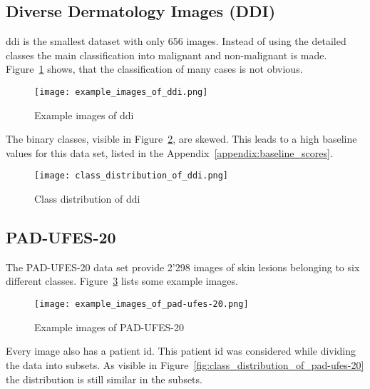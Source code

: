 \subsection{Diverse Dermatology Images (DDI)}
\gls{ddi} is the smallest dataset with only 656 images. Instead of using the detailed classes the main classification into malignant and non-malignant is made.
Figure~\ref{fig:example_images_of_ddi} shows, that the classification of many cases is not obvious.
\begin{figure}[H]
    \begin{center}
    \texttt{[image: example\_images\_of\_ddi.png]}
    \caption{Example images of \gls{ddi}}\label{fig:example_images_of_ddi}
    \end{center}
\end{figure}

The binary classes, visible in Figure~\ref{fig:class_distribution_of_ddi}, are skewed. This leads to a high baseline values for this data set, listed in the Appendix~\ref{appendix:baseline_scores}.

\begin{figure}[H]
    \begin{center}
    \texttt{[image: class\_distribution\_of\_ddi.png]}
    \caption{Class distribution of \gls{ddi}}\label{fig:class_distribution_of_ddi}
    \end{center}
\end{figure}


\subsection{PAD-UFES-20}
The PAD-UFES-20 data set provide 2'298 images of skin lesions belonging to six different classes. 
Figure~\ref{fig:example_images_of_pad-ufes-20} lists some example images.

\begin{figure}[H]
    \begin{center}
    \texttt{[image: example\_images\_of\_pad-ufes-20.png]}
    \caption{Example images of PAD-UFES-20}\label{fig:example_images_of_pad-ufes-20}
    \end{center}
\end{figure}

Every image also has a patient id. This patient id was considered while dividing the data into subsets. As visible in Figure~\ref{fig:class_distribution_of_pad-ufes-20} the distribution is still similar in the subsets. 

